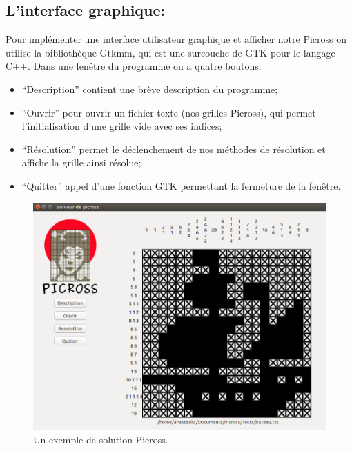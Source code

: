 \documentclass{article}
\begin{document}
\subsection{ L'interface graphique:}
Pour implémenter une interface utilisateur graphique et afficher notre Picross on utilise la bibliothèque Gtkmm, qui est une surcouche de GTK pour le langage C++.
Dans une fenêtre du programme on a quatre boutons:
\begin{itemize}
\item  ``Description'' contient une brève description du programme;
\item ``Ouvrir'' pour ouvrir un fichier texte (nos grilles Picross), qui permet l'initialisation d'une grille vide avec ses indices;
\item ``Résolution'' permet le déclenchement de nos méthodes de résolution et affiche la grille ainsi résolue;
\item ``Quitter'' appel d'une fonction GTK permettant la fermeture de la fenêtre.
\end{itemize}
\begin{landscape}
\begin{figure}
\begin{center}
\includegraphics[width=15cm]{picross}
\end{center}
\caption{Un exemple de solution Picross.}
\end{figure}
\end{landscape}
\end{document}
